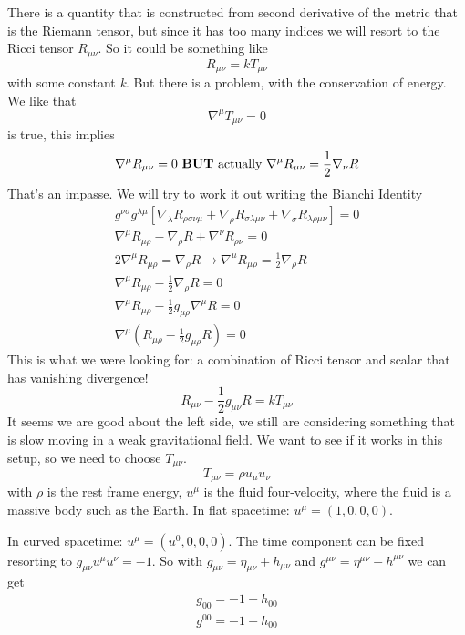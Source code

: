 There is a quantity that is constructed from second derivative of the metric that is the Riemann tensor, but since it has too many indices we will resort to the Ricci tensor $R_{\mu \nu }$. So it could be something like
\[
R_{\mu \nu } = k T_{\mu \nu }
\]
with some constant \emph{k}. But there is a problem, with the conservation of energy. We like that 
\[
\nabla ^{\mu }T_{\mu \nu } = 0
\]
is true, this implies
\[
\nabla ^{\mu }R_{\mu \nu } = 0 \text{ \textbf{BUT} actually  } \nabla^{\mu }R_{\mu \nu } = \frac{1}{2}\nabla _{\nu }R
\]
That's an impasse. We will try to work it out writing the Bianchi Identity
\begin{gather*}
	g^{\nu \sigma }g^{\lambda \mu } \left[ \nabla _{\lambda }R_{\rho \sigma \nu \mu } + \nabla _{\rho }R_{\sigma \lambda \mu \nu } + \nabla _{\sigma }R_{\lambda \rho \mu \nu }\right] =0 \\
	\nabla ^{\mu }R_{\mu \rho }- \nabla _{\rho }R	+ \nabla ^{\nu }R_{\rho \nu } =0\\
	2\nabla ^{\mu }R_{\mu \rho } = \nabla _{\rho }R \to \nabla^{\mu }R_{\mu \rho } = \frac{1}{2} \nabla _{\rho }R \\
	\nabla ^{\mu }R_{\mu \rho } - \frac{1}{2} \nabla _{\rho }R = 0 \\
	\nabla ^{\mu }R_{\mu \rho } - \frac{1}{2} g_{\mu \rho } \nabla ^{\mu }R = 0 \\
	\nabla ^{\mu } \left( R_{\mu \rho } - \frac{1}{2} g_{\mu \rho }R \right) = 0
\end{gather*}
This is what we were looking for: a combination of Ricci tensor and scalar that has vanishing divergence!
\begin{equation}
R_{\mu \nu } - \frac{1}{2}g_{\mu \nu }R = k T_{\mu \nu }
\end{equation}
It seems we are good about the left side, we still are considering something that is slow moving in a weak gravitational field. We want to see if it works in this setup, so we need to choose $T_{\mu \nu }$.
\[
	T_{\mu \nu } = \rho  u_{\mu }u_{\nu }
\]
with $\rho $ is the rest frame energy, $u^{\mu }$ is the fluid four-velocity, where the fluid is a massive body such as the Earth.
In flat spacetime: $u^{\mu } = \left( 1,0,0,0 \right)$. \par
In curved spacetime: $u^{\mu } = \left( u^{0}, 0,0,0 \right)$.
The time component can be fixed resorting to $g_{\mu \nu }u^{\mu }u^{\nu } = -1$. So with
$g_{\mu \nu } = \eta _{\mu \nu } + h_{\mu \nu }$ and $g^{\mu \nu } = \eta ^{\mu \nu } - h^{\mu \nu }$ we can get
\begin{gather*}
g_{00} = -1 + h_{00} \\
g^{00} = -1 - h_{00}
\end{gather*}
